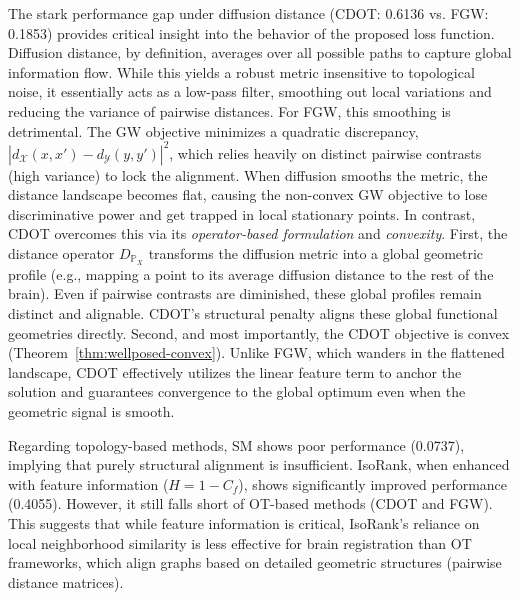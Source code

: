 \documentclass{article}
\theoremstyle{plain}
\theoremstyle{definition}
\theoremstyle{remark}
\begin{document}
The stark performance gap under diffusion distance (CDOT: 0.6136 vs. FGW: 0.1853) provides critical insight into the behavior of the proposed loss function. Diffusion distance, by definition, averages over all possible paths to capture global information flow. While this yields a robust metric insensitive to topological noise, it essentially acts as a low-pass filter, smoothing out local variations and reducing the variance of pairwise distances. For FGW, this smoothing is detrimental. The GW objective minimizes a quadratic discrepancy, $|d_{\mathcal{X}}(x,x') - d_{\mathcal{Y}}(y,y')|^2$, which relies heavily on distinct pairwise contrasts (high variance) to lock the alignment. When diffusion smooths the metric, the distance landscape becomes flat, causing the non-convex GW objective to lose discriminative power and get trapped in local stationary points. In contrast, CDOT overcomes this via its \textit{operator-based formulation} and \textit{convexity}.
First, the distance operator $D_{\mathbb{P}_X}$ transforms the diffusion metric into a global geometric profile (e.g., mapping a point to its average diffusion distance to the rest of the brain). Even if pairwise contrasts are diminished, these global profiles remain distinct and alignable. CDOT's structural penalty aligns these global functional geometries directly.
Second, and most importantly, the CDOT objective is convex (Theorem~\ref{thm:wellposed-convex}). Unlike FGW, which wanders in the flattened landscape, CDOT effectively utilizes the linear feature term to anchor the solution and guarantees convergence to the global optimum even when the geometric signal is smooth.

Regarding topology-based methods, SM shows poor performance (0.0737), implying that purely structural alignment is insufficient. IsoRank, when enhanced with feature information ($H = 1-C_f$), shows significantly improved performance (0.4055). However, it still falls short of OT-based methods (CDOT and FGW). This suggests that while feature information is critical, IsoRank's reliance on local neighborhood similarity is less effective for brain registration than OT frameworks, which align graphs based on detailed geometric structures (pairwise distance matrices).
\end{document}

